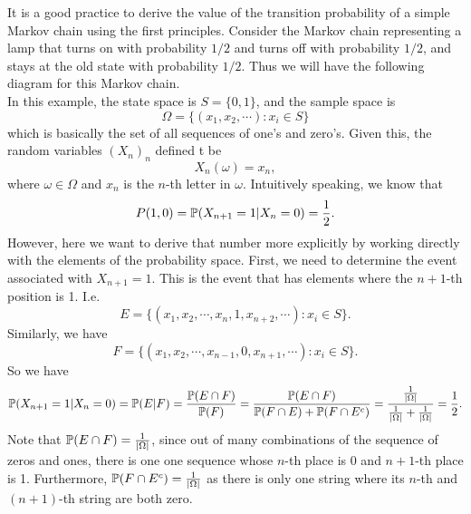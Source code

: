 \begin{problem}
	It is a good practice to derive the value of the transition probability of a simple Markov chain using the first principles. Consider the Markov chain representing a lamp that turns on with probability $1/2$ and turns off with probability $1/2$, and stays at the old state with probability $1/2$. Thus we will have the following diagram for this Markov chain.
	\\
	In this example, the state space is $S = \{0,1\}$, and the sample space is
	\[ \Omega = \{ (x_1,x_2,\cdots): x_i \in S \} \]
	which is basically the set of all sequences of one's and zero's. Given this, the random variables $(X_n)_n$ defined t be
	\[  X_n (\omega) = x_n, \]  
	where $\omega \in \Omega$ and $x_n$ is the $n$-th letter in $\omega$. Intuitively speaking, we know that 
	\[  P(1,0) = \mathbb{P}(X_{n+1} = 1 | X_n = 0) = \frac{1}{2}. \]
	However, here we want to derive that number more explicitly by working directly with the elements of the probability space. First, we need to determine the event associated with $X_{n+1} = 1$. This is the event that has elements where the $n+1$-th position is 1. I.e.
	\[  E = \{  (x_1,x_2, \cdots, x_n, 1, x_{n+2}, \cdots) : x_i \in S\}.  \]
	Similarly, we have
	\[ F = \{ (x_1,x_2, \cdots, x_{n-1},0,x_{n+1},\cdots): x_i \in S \}. \]
	So we have
	\[ \mathbb{P}(X_{n+1} = 1 | X_n = 0)  = \mathbb{P}(E|F) = \frac{\mathbb{P}(E\cap F)}{\mathbb{P}(F)} =\frac{\mathbb{P}(E\cap F)}{\mathbb{P}(F\cap E) + \mathbb{P}(F\cap E^c)} = \frac{\frac{1}{|\Omega|}}{\frac{1}{|\Omega|} + \frac{1}{|\Omega|}} = \frac{1}{2}. \]
	Note that $\mathbb{P}(E\cap F) = \frac{1}{|\Omega|}$, since out of many combinations of the sequence of zeros and ones, there is one one sequence whose $n$-th place is 0 and $n+1$-th place is 1. Furthermore, $\mathbb{P}(F\cap E^c) = \frac{1}{|\Omega|}$ as there is only one string where its $n$-th and $(n+1)$-th string are both zero. 
\end{problem}

